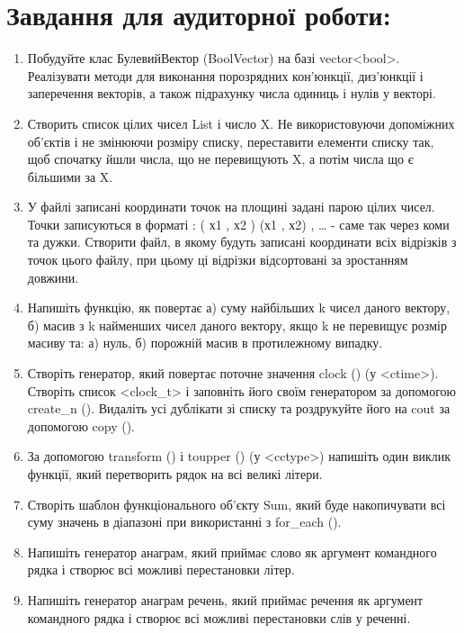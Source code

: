 \documentclass[a5paper,titlepage,openany,twoside,draft]{book_unv}%
\begin{document}
\section{Завдання для аудиторної роботи:}

\begin{enumerate}
\def\labelenumi{\arabic{enumi})}

\item
Побудуйте клас БулевийВектор (BoolVector) на базі vector\textless{}bool\textgreater{}. 
Реалізувати методи для виконання порозрядних кон'юнкції, диз'юнкції і 
заперечення векторів, а також підрахунку числа одиниць і нулів у векторі.
  
\item
  Створить список цілих чисел List і число X. Не використовуючи
  допоміжних об'єктів і не змінюючи розміру списку, переставити елементи
  списку так, щоб спочатку йшли числа, що не перевищують X, а потім
  числа що є більшими за X.

\item
  У файлі записані координати точок на площині задані парою цілих чисел.
  Точки записуються в форматі : ( х1 , х2 ) (х1 , х2) , \ldots{} - саме
  так через коми та дужки. Створити файл, в якому будуть записані
  координати всіх відрізків з точок цього файлу, при цьому ці відрізки
  відсортовані за зростанням довжини.
\item
  Напишіть функцію, як повертає а) суму найбільших k чисел даного
  вектору, б) масив з k найменших чисел даного вектору, якщо k не
  перевищує розмір масиву та: а) нуль, б) порожній масив в протилежному
  випадку.
\item
  Створіть генератор, який повертає поточне значення clock () (у
  \textless{}ctime\textgreater{}). Створіть список
  \textless{}clock\_t\textgreater{} і заповніть його своїм генератором
  за допомогою create\_n (). Видаліть усі дублікати зі списку та
  роздрукуйте його на cout за допомогою copy ().
\item
  За допомогою transform () і toupper () (у
  \textless{}cctype\textgreater{}) напишіть один виклик функції, який
  перетворить рядок на всі великі літери.
\item
  Створіть шаблон функціонального об'єкту Sum, який буде накопичувати всі
  суму значень в діапазоні при використанні з for\_each ().
\item
  Напишіть генератор анаграм, який приймає слово як аргумент командного
  рядка і створює всі можливі перестановки літер.
\item
  Напишіть генератор анаграм речень, який приймає речення як аргумент
  командного рядка і створює всі можливі перестановки слів у реченні.
\end{enumerate}
\end{document}
